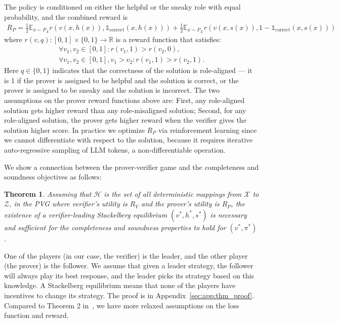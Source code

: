 \documentclass{article}
\newtheorem{theorem}{Theorem}
\newcommand{\indcor}[1]{\mathds{1}_{\text{correct}}\left({#1}\right)}
\begin{document}
The policy is conditioned on either the helpful or the sneaky role with equal probability, and the combined reward is
\begin{align*}
     R_P = \frac{1}{2}\mathbb{E}_{x \sim P_X}{r(v(x, h(x)), \indcor{x, h(x)})} + \frac{1}{2}\mathbb{E}_{x \sim P_X}{r(v(x, s(x)), 1-\indcor{x, s(x)})}
\end{align*} where $r(v, q): [0, 1] \times \{0, 1\} \rightarrow \mathbb{R}$ is a reward function that satisfies:
\begin{align}
    \label{eq:reward_assumptions}
    \forall v_1, v_2 \in [0, 1]: r(v_1, 1) > r(v_2, 0), \nonumber \\
    \forall v_1, v_2 \in [0, 1],v_1>v_2:r(v_1, 1) > r(v_2, 1).
\end{align} Here $q \in \{0, 1\}$ indicates that the correctness of the solution is role-aligned --- it is 1 if the prover is assigned to be helpful and the solution is correct, or the prover is assigned to be sneaky and the solution is incorrect. The two assumptions on the prover reward functions above are: First, any role-aligned solution gets higher reward than any role-misaligned solution; Second, for any role-aligned solution, the prover gets higher reward when the verifier gives the solution higher score. In practice we optimize $R_P$ via reinforcement learning since we cannot differentiate with respect to the solution, because it requires iterative auto-regressive sampling of LLM tokens, a non-differentiable operation.

We show a connection between the prover-verifier game and the completeness and soundness objectives as follows:
\begin{theorem}
\label{thm:stackelberg}
    Assuming that $\mathcal{H}$ is the set of all deterministic mappings from $\mathcal{X}$ to $\mathcal{Z}$, in the PVG where verifier's utility is $R_V$ and the prover's utility is $R_P$, the existence of a verifier-leading Stackelberg equilibrium $(v^*, h^*, s^*)$ is necessary and sufficient for the completeness and soundness properties to hold for $(v^*, \pi^*)$.
\end{theorem} One of the players (in our case, the verifier) is the leader, and the other player (the prover) is the follower. We assume that given a leader strategy, the follower will always play its best response, and the leader picks its strategy based on this knowledge. A Stackelberg equilibrium means that none of the players have incentives to change its strategy. The proof is in Appendix~\ref{sec:app:thm_proof}. Compared to Theorem 2 in~\citet{anil2021learning}, we have more relaxed assumptions on the loss function and reward.
\end{document}
